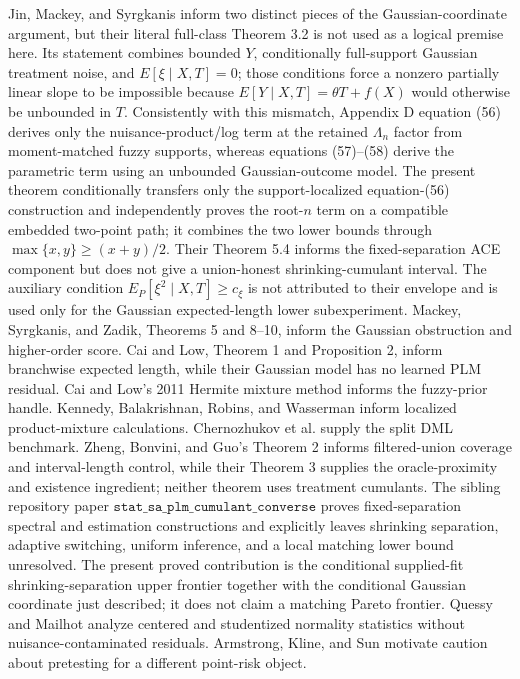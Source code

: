 \documentclass{article}
\begin{document}
Jin, Mackey, and Syrgkanis inform two distinct pieces of the Gaussian-coordinate argument, but their literal full-class Theorem 3.2 is not used as a logical premise here. Its statement combines bounded \(Y\), conditionally full-support Gaussian treatment noise, and \(E[\xi\mid X,T]=0\); those conditions force a nonzero partially linear slope to be impossible because \(E[Y\mid X,T]=\theta T+f(X)\) would otherwise be unbounded in \(T\). Consistently with this mismatch, Appendix D equation (56) derives only the nuisance-product/log term at the retained \(\Lambda_n\) factor from moment-matched fuzzy supports, whereas equations (57)--(58) derive the parametric term using an unbounded Gaussian-outcome model. The present theorem conditionally transfers only the support-localized equation-(56) construction and independently proves the root-\(n\) term on a compatible embedded two-point path; it combines the two lower bounds through \(\max\{x,y\}\ge (x+y)/2\). Their Theorem 5.4 informs the fixed-separation ACE component but does not give a union-honest shrinking-cumulant interval. The auxiliary condition \(E_P[\xi^2\mid X,T]\ge c_{\xi}\) is not attributed to their envelope and is used only for the Gaussian expected-length lower subexperiment. Mackey, Syrgkanis, and Zadik, Theorems 5 and 8--10, inform the Gaussian obstruction and higher-order score. Cai and Low, Theorem 1 and Proposition 2, inform branchwise expected length, while their Gaussian model has no learned PLM residual. Cai and Low's 2011 Hermite mixture method informs the fuzzy-prior handle. Kennedy, Balakrishnan, Robins, and Wasserman inform localized product-mixture calculations. Chernozhukov et al. supply the split DML benchmark. Zheng, Bonvini, and Guo's Theorem 2 informs filtered-union coverage and interval-length control, while their Theorem 3 supplies the oracle-proximity and existence ingredient; neither theorem uses treatment cumulants. The sibling repository paper \(\texttt{stat\_sa\_plm\_cumulant\_converse}\) proves fixed-separation spectral and estimation constructions and explicitly leaves shrinking separation, adaptive switching, uniform inference, and a local matching lower bound unresolved. The present proved contribution is the conditional supplied-fit shrinking-separation upper frontier together with the conditional Gaussian coordinate just described; it does not claim a matching Pareto frontier. Quessy and Mailhot analyze centered and studentized normality statistics without nuisance-contaminated residuals. Armstrong, Kline, and Sun motivate caution about pretesting for a different point-risk object.
\end{document}
